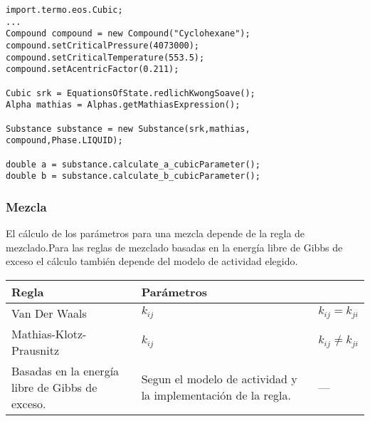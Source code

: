 \begin{lstlisting}[caption=Cálculo de los parámetros de la ecuación de estado Soave Redlich Kwong y la expresión de $\alpha$ de mathias para el compuesto ]
import.termo.eos.Cubic;
...
Compound compound = new Compound("Cyclohexane");
compound.setCriticalPressure(4073000);
compound.setCriticalTemperature(553.5);
compound.setAcentricFactor(0.211);

Cubic srk = EquationsOfState.redlichKwongSoave();
Alpha mathias = Alphas.getMathiasExpression();

Substance substance = new Substance(srk,mathias, compound,Phase.LIQUID);

double a = substance.calculate_a_cubicParameter();
double b = substance.calculate_b_cubicParameter();
\end{lstlisting}





\subsubsection{Mezcla}

El cálculo de los parámetros para una mezcla depende de la regla de mezclado.Para las reglas de mezclado basadas en la energía libre de Gibbs de exceso el cálculo también depende del modelo de actividad elegido.

\begin{tabularx}{\textwidth}{|X|X|X|}
	\hline
	Regla & Parámetros & \\
	\hline
	Van Der Waals & $k_{ij}$ & $k_{ij} = k_{ji}$ \\
	Mathias-Klotz-Prausnitz& $k_{ij}$ & $k_{ij} \neq k_{ji}$ \\
	Basadas en la energía libre de Gibbs de exceso. & Segun el modelo de actividad y la implementación de la regla.& --- \\
	\hline
\end{tabularx}



